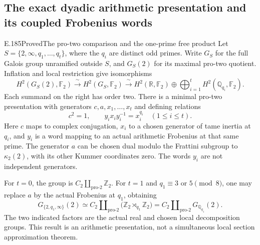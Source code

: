 \subsection{The exact dyadic arithmetic presentation and its coupled Frobenius words}

\begin{result}{E.185}{Proved}{The pro-two comparison and the one-prime free product}
Let \(S=\{2,\infty,q_1,\ldots,q_t\}\), where the \(q_i\) are
distinct odd primes. Write \(G_S\) for the full Galois group
unramified outside \(S\), and \(G_S(2)\) for its maximal pro-two
quotient. Inflation and local restriction give isomorphisms
\[
 H^2(G_S(2),\mathbb F_2)
   \xrightarrow{\ \sim\ }H^2(G_S,\mathbb F_2)
   \xrightarrow{\ \sim\ }
 H^2(\mathbb R,\mathbb F_2)
       \oplus\bigoplus_{i=1}^t H^2(\mathbb Q_{q_i},\mathbb F_2).
 \tag{E.185.1}
\]
Each summand on the right has order two. There is a minimal
pro-two presentation with generators
\(c,a,x_1,\ldots,x_t\) and defining relations
\[
 c^2=1,\qquad
       y_i x_i y_i^{-1}=x_i^{q_i}\quad(1\leq i\leq t).
 \tag{E.185.2}
\]
Here \(c\) maps to complex conjugation, \(x_i\) to a chosen
generator of tame inertia at \(q_i\), and \(y_i\) is a word
mapping to an actual arithmetic Frobenius at that same prime.
The generator \(a\) can be chosen dual modulo the Frattini
subgroup to \(\kappa_2(2)\), with its other Kummer coordinates
zero. The words \(y_i\) are not independent generators.

For \(t=0\), the group is \(C_2\amalg_{\mathrm{pro}\text{-}2}\mathbb Z_2\).
For \(t=1\) and \(q_1\equiv3\) or \(5\pmod8\), one may
replace \(a\) by the actual Frobenius at \(q_1\), obtaining
\[
 G_{\{2,q_1,\infty\}}(2)
    \simeq C_2\amalg_{\mathrm{pro}\text{-}2}
                \bigl(\mathbb Z_2\rtimes_{q_1}\mathbb Z_2\bigr)
    = C_2\amalg_{\mathrm{pro}\text{-}2}G_{\mathbb Q_{q_1}}(2).
 \tag{E.185.3}
\]
The two indicated factors are the actual real and chosen local
decomposition groups. This result is an arithmetic presentation,
not a simultaneous local section approximation theorem.
\end{result}

